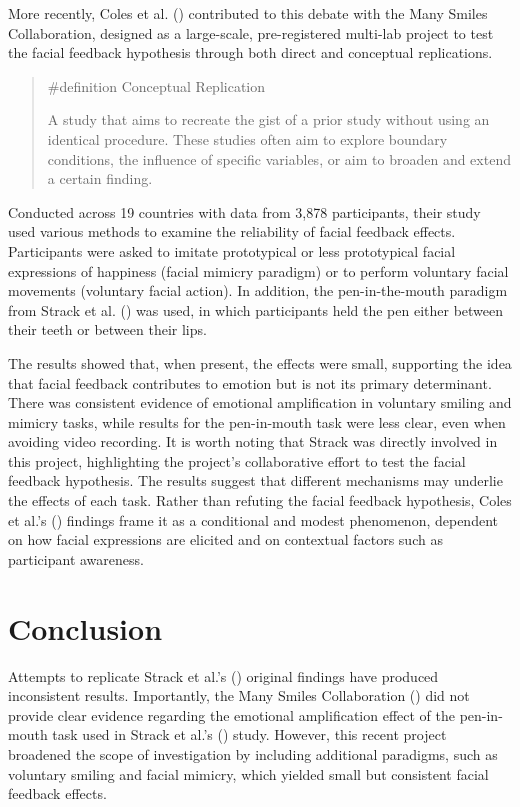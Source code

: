 \documentclass[
  letterpaper,
]{book}
\begin{document}
More recently, Coles et al. ()
contributed to this debate with the Many Smiles Collaboration, designed
as a large-scale, pre-registered multi-lab project to test the facial
feedback hypothesis through both direct and conceptual replications.

\begin{quote}
\label{def-conceptualreplication}{\#definition}
Conceptual Replication

A study that aims to recreate the gist of a prior study without using an
identical procedure. These studies often aim to explore boundary
conditions, the influence of specific variables, or aim to broaden and
extend a certain finding.
\end{quote}

Conducted across 19 countries with data from 3,878 participants, their
study used various methods to examine the reliability of facial feedback
effects. Participants were asked to imitate prototypical or less
prototypical facial expressions of happiness (facial mimicry paradigm)
or to perform voluntary facial movements (voluntary facial action). In
addition, the pen-in-the-mouth paradigm from Strack et al.
() was used, in which
participants held the pen either between their teeth or between their
lips.

The results showed that, when present, the effects were small,
supporting the idea that facial feedback contributes to emotion but is
not its primary determinant. There was consistent evidence of emotional
amplification in voluntary smiling and mimicry tasks, while results for
the pen-in-mouth task were less clear, even when avoiding video
recording. It is worth noting that Strack was directly involved in this
project, highlighting the project's collaborative effort to test the
facial feedback hypothesis. The results suggest that different
mechanisms may underlie the effects of each task. Rather than refuting
the facial feedback hypothesis, Coles et al.'s
() findings frame it as a
conditional and modest phenomenon, dependent on how facial expressions
are elicited and on contextual factors such as participant awareness.

\section{Conclusion}\label{conclusion-22}

Attempts to replicate Strack et al.'s
() original findings have
produced inconsistent results. Importantly, the Many Smiles
Collaboration ()
did not provide clear evidence regarding the emotional amplification
effect of the pen-in-mouth task used in Strack et al.'s
() study. However, this
recent project broadened the scope of investigation by including
additional paradigms, such as voluntary smiling and facial mimicry,
which yielded small but consistent facial feedback effects.
\end{document}

